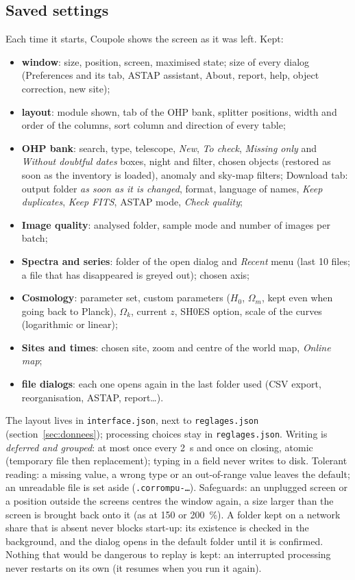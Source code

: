 \subsection{Saved settings}\label{sec:conserves}
Each time it starts, Coupole shows the screen as it was left. Kept:
\begin{itemize}
\item \textbf{window}: size, position, screen, maximised state; size of every dialog (Preferences and its tab, ASTAP
  assistant, About, report, help, object correction, new site);
\item \textbf{layout}: module shown, tab of the OHP bank, splitter positions, width and order of the columns, sort
  column and direction of every table;
\item \textbf{OHP bank}: search, type, telescope, \emph{New}, \emph{To check}, \emph{Missing only} and \emph{Without
  doubtful dates} boxes, night and filter, chosen objects (restored as soon as the inventory is loaded), anomaly and
  sky-map filters; Download tab: output folder \emph{as soon as it is changed}, format, language of names,
  \emph{Keep duplicates}, \emph{Keep FITS}, ASTAP mode, \emph{Check quality};
\item \textbf{Image quality}: analysed folder, sample mode and number of images per batch;
\item \textbf{Spectra and series}: folder of the open dialog and \emph{Recent} menu (last 10 files; a file that has
  disappeared is greyed out); chosen axis;
\item \textbf{Cosmology}: parameter set, custom parameters ($H_0$, $\Omega_m$, kept even when going back to Planck),
  $\Omega_k$, current $z$, SH0ES option, scale of the curves (logarithmic or linear);
\item \textbf{Sites and times}: chosen site, zoom and centre of the world map, \emph{Online map};
\item \textbf{file dialogs}: each one opens again in the last folder used (CSV export, reorganisation, ASTAP,
  report…).
\end{itemize}
The layout lives in \texttt{interface.json}, next to \texttt{reglages.json} (section~\ref{sec:donnees}); processing
choices stay in \texttt{reglages.json}. Writing is \emph{deferred and grouped}: at most once every 2~s and once on
closing, atomic (temporary file then replacement); typing in a field never writes to disk. Tolerant reading: a missing
value, a wrong type or an out-of-range value leaves the default; an unreadable file is set aside
(\texttt{.corrompu-…}). Safeguards: an unplugged screen or a position outside the screens centres the window again, a
size larger than the screen is brought back onto it (as at 150 or 200~\%). A folder kept on a network share that is
absent never blocks start-up: its existence is checked in the background, and the dialog opens in the default folder
until it is confirmed. Nothing that would be dangerous to replay is kept: an interrupted processing never restarts on
its own (it resumes when you run it again).

